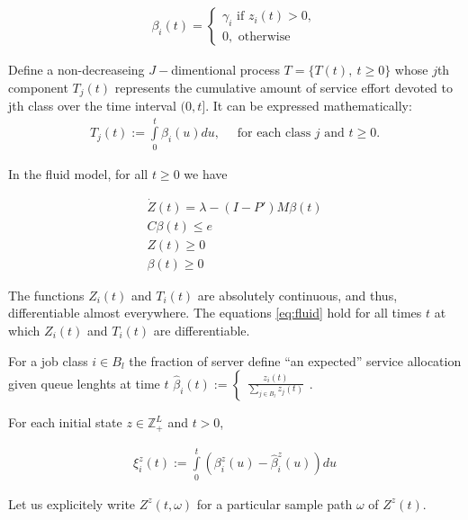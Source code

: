\documentclass[11pt]{article}
\newcommand{\Z}{\mathbb{Z}}
\theoremstyle{definition}
\numberwithin{equation}{section}
\begin{document}
\begin{align}
\beta_i(t) = 
\begin{cases}
\gamma_i \text{ if }z_i(t)>0,\\
0, \text{ otherwise}
\end{cases}
\end{align}

Define a non-decreaseing $J-$dimentional process $T  = \{T(t), ~t\geq 0\}$ whose $j$th component $T_j(t)$ represents the cumulative amount of service effort devoted to jth class over the time interval $(0, t].$ It can be expressed mathematically:
\begin{align}
T_j(t):=\int\limits_0^t \beta_i(u)du,\quad \text{ for each class } j\text{ and } t\geq 0.
\end{align}


In the fluid model, for all $t\geq 0$ we have


\begin{align}\label{eq:fluid}
\dot Z(t) = \lambda - (I-P')M\beta(t)\\
C\beta(t)\leq e\\
Z(t)\geq 0\\
\beta(t)\geq 0
\end{align}


The functions $Z_i(t)$ and $T_i(t)$ are absolutely continuous, and thus, differentiable almost everywhere. The equations \ref{eq:fluid} hold for all times $t$ at which $Z_i(t)$ and $T_i(t)$ are differentiable.


For a job class $i\in B_l$ the fraction of server define ``an expected'' service allocation given queue lenghts at time $t$
  $\hat \beta_i(t) := \begin{cases} \frac{z_i(t)}{\sum\limits_{j\in B_l} z_j(t)} \end{cases}$.
  
  
  
  For each initial state $z\in \Z_+^L$ and $t > 0$, 
  
  \begin{align}
  \xi_i^z(t) := \int \limits_{0}^t ( \beta_i^z(u)  - \hat \beta_i^z(u)) du
  \end{align} 

Let us explicitely write $Z^z(t, \omega)$ for a particular sample path $\omega$ of $Z^z(t).$
\end{document}
